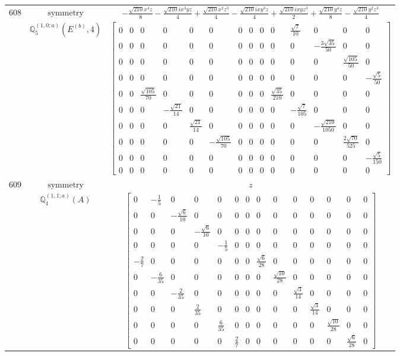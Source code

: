 \documentclass[fleqn,8pt,landscape]{jsarticle}
\begin{document}
\begin{longtable}{ccc}
$ 608 $ & $ \text{symmetry} $ & $ - \frac{\sqrt{210} x^{4} z}{8} - \frac{\sqrt{210} i x^{3} y z}{4} + \frac{\sqrt{210} x^{2} z^{3}}{4} - \frac{\sqrt{210} i x y^{3} z}{4} + \frac{\sqrt{210} i x y z^{3}}{2} + \frac{\sqrt{210} y^{4} z}{8} - \frac{\sqrt{210} y^{2} z^{3}}{4} $ \\
$  $ & $ \mathbb{Q}_{5}^{(1,0;a)}(E^{(b)},4) $ & $ \begin{bmatrix} 0 & 0 & 0 & 0 & 0 & 0 & 0 & 0 & 0 & 0 & \frac{\sqrt{7}}{10} & 0 & 0 & 0 \\ 0 & 0 & 0 & 0 & 0 & 0 & 0 & 0 & 0 & 0 & 0 & - \frac{3 \sqrt{35}}{50} & 0 & 0 \\ 0 & 0 & 0 & 0 & 0 & 0 & 0 & 0 & 0 & 0 & 0 & 0 & \frac{\sqrt{105}}{50} & 0 \\ 0 & 0 & 0 & 0 & 0 & 0 & 0 & 0 & 0 & 0 & 0 & 0 & 0 & - \frac{\sqrt{5}}{50} \\ 0 & 0 & \frac{\sqrt{105}}{70} & 0 & 0 & 0 & 0 & 0 & 0 & \frac{\sqrt{35}}{210} & 0 & 0 & 0 & 0 \\ 0 & 0 & 0 & - \frac{\sqrt{21}}{14} & 0 & 0 & 0 & 0 & 0 & 0 & - \frac{\sqrt{7}}{105} & 0 & 0 & 0 \\ 0 & 0 & 0 & 0 & \frac{\sqrt{21}}{14} & 0 & 0 & 0 & 0 & 0 & 0 & - \frac{\sqrt{210}}{1050} & 0 & 0 \\ 0 & 0 & 0 & 0 & 0 & - \frac{\sqrt{105}}{70} & 0 & 0 & 0 & 0 & 0 & 0 & \frac{2 \sqrt{70}}{525} & 0 \\ 0 & 0 & 0 & 0 & 0 & 0 & 0 & 0 & 0 & 0 & 0 & 0 & 0 & - \frac{\sqrt{5}}{150} \\ 0 & 0 & 0 & 0 & 0 & 0 & 0 & 0 & 0 & 0 & 0 & 0 & 0 & 0 \end{bmatrix} $ \\ \hline
$ 609 $ & $ \text{symmetry} $ & $ z $ \\
$  $ & $ \mathbb{Q}_{1}^{(1,1;a)}(A) $ & $ \begin{bmatrix} 0 & - \frac{1}{5} & 0 & 0 & 0 & 0 & 0 & 0 & 0 & 0 & 0 & 0 & 0 & 0 \\ 0 & 0 & - \frac{\sqrt{6}}{10} & 0 & 0 & 0 & 0 & 0 & 0 & 0 & 0 & 0 & 0 & 0 \\ 0 & 0 & 0 & - \frac{\sqrt{6}}{10} & 0 & 0 & 0 & 0 & 0 & 0 & 0 & 0 & 0 & 0 \\ 0 & 0 & 0 & 0 & - \frac{1}{5} & 0 & 0 & 0 & 0 & 0 & 0 & 0 & 0 & 0 \\ - \frac{2}{7} & 0 & 0 & 0 & 0 & 0 & 0 & \frac{\sqrt{6}}{28} & 0 & 0 & 0 & 0 & 0 & 0 \\ 0 & - \frac{6}{35} & 0 & 0 & 0 & 0 & 0 & 0 & \frac{\sqrt{10}}{28} & 0 & 0 & 0 & 0 & 0 \\ 0 & 0 & - \frac{2}{35} & 0 & 0 & 0 & 0 & 0 & 0 & \frac{\sqrt{3}}{14} & 0 & 0 & 0 & 0 \\ 0 & 0 & 0 & \frac{2}{35} & 0 & 0 & 0 & 0 & 0 & 0 & \frac{\sqrt{3}}{14} & 0 & 0 & 0 \\ 0 & 0 & 0 & 0 & \frac{6}{35} & 0 & 0 & 0 & 0 & 0 & 0 & \frac{\sqrt{10}}{28} & 0 & 0 \\ 0 & 0 & 0 & 0 & 0 & \frac{2}{7} & 0 & 0 & 0 & 0 & 0 & 0 & \frac{\sqrt{6}}{28} & 0 \end{bmatrix} $ \\ \hline

\end{longtable}
\end{document}
